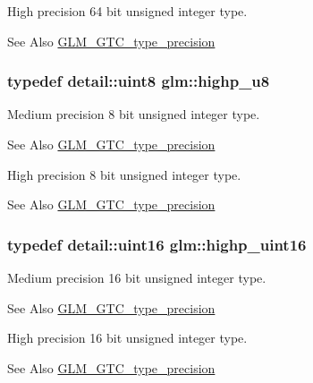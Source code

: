 High precision 64 bit unsigned integer type. \begin{DoxySeeAlso}{See Also}
\hyperlink{group__gtc__type__precision}{G\-L\-M\-\_\-\-G\-T\-C\-\_\-type\-\_\-precision} 
\end{DoxySeeAlso}
\hypertarget{group__gtc__type__precision_ga8a60abe782749c504fb5ae51eb8b49cc}{
\subsubsection[{highp\-\_\-u8}]{\setlength{\rightskip}{0pt plus 5cm}typedef detail\-::uint8 {\bf glm\-::highp\-\_\-u8}}}\label{group__gtc__type__precision_ga8a60abe782749c504fb5ae51eb8b49cc}
Medium precision 8 bit unsigned integer type. \begin{DoxySeeAlso}{See Also}
\hyperlink{group__gtc__type__precision}{G\-L\-M\-\_\-\-G\-T\-C\-\_\-type\-\_\-precision}
\end{DoxySeeAlso}
High precision 8 bit unsigned integer type. \begin{DoxySeeAlso}{See Also}
\hyperlink{group__gtc__type__precision}{G\-L\-M\-\_\-\-G\-T\-C\-\_\-type\-\_\-precision} 
\end{DoxySeeAlso}
\hypertarget{group__gtc__type__precision_ga4d32967d45ba8365e2a05eaaac85e978}{
\subsubsection[{highp\-\_\-uint16}]{\setlength{\rightskip}{0pt plus 5cm}typedef detail\-::uint16 {\bf glm\-::highp\-\_\-uint16}}}\label{group__gtc__type__precision_ga4d32967d45ba8365e2a05eaaac85e978}
Medium precision 16 bit unsigned integer type. \begin{DoxySeeAlso}{See Also}
\hyperlink{group__gtc__type__precision}{G\-L\-M\-\_\-\-G\-T\-C\-\_\-type\-\_\-precision}
\end{DoxySeeAlso}
High precision 16 bit unsigned integer type. \begin{DoxySeeAlso}{See Also}
\hyperlink{group__gtc__type__precision}{G\-L\-M\-\_\-\-G\-T\-C\-\_\-type\-\_\-precision} 
\end{DoxySeeAlso}
